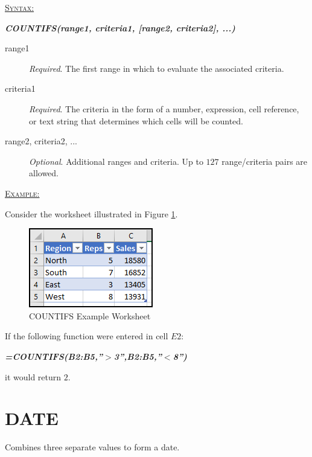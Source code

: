 \begin{addmargin}[1cm]{0cm}

	\medskip
	\underline{\textsc{Syntax:}}
	\medskip

	{\color{Syntax}
		\noindent\textbf{\textit{COUNTIFS(range1, criteria1, [range2, criteria2], ...)}}
	}
	
	\begin{description}
		\item[range1] \textit{Required}. The first range in which to evaluate the associated criteria.
		\item[criteria1] \textit{Required}. The criteria in the form of a number, expression, cell reference, or text string that determines which cells will be counted.
		\item[range2, criteria2, ...] \textit{Optional}. Additional ranges and criteria. Up to $ 127 $ range/criteria pairs are allowed.
	\end{description}

	\medskip
	\noindent\underline{\textsc{Example:}}
	\medskip
	
	\noindent Consider the worksheet illustrated in Figure \ref{apa:cfs}.

	\begin{figure}[H]
		\centering
		\includegraphics[width=\maxwidth{.45\linewidth}]{gfx/apa_fig01}
		\caption{COUNTIFS Example Worksheet}
		\label{apa:cfs}
	\end{figure}
	
	\noindent If the following function were entered in cell $ E2 $:
	
	{\color{Syntax}
		\textit{\textbf{=COUNTIFS(B2:B5,''$ > $3'',B2:B5,''$ < $8'')}}
	}
	
	\noindent it would return $ 2 $.

\end{addmargin}

\section{DATE}

Combines three separate values to form a date.

